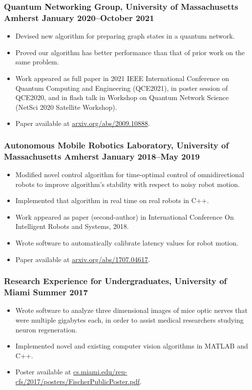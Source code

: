 \documentclass{article}
\begin{document}
		\subsubsection*{Quantum Networking Group, University of Massachusetts Amherst \hfill \normalfont \normalsize January 2020--October 2021}
			\begin{itemize}[leftmargin=40pt]
				\item Devised new algorithm for preparing graph states in a quantum network.
				\item Proved our algorithm has better performance than that of prior work on the same problem.
				\item Work appeared as full paper in 2021 IEEE International Conference on Quantum Computing and Engineering (QCE2021), in poster session of QCE2020, and in flash talk in Workshop on Quantum Network Science (NetSci 2020 Satellite Workshop).
				\item Paper available at \href{https://arxiv.org/abs/2009.10888}{arxiv.org/abs/2009.10888}.
			\end{itemize}
		\subsubsection*{Autonomous Mobile Robotics Laboratory, University of Massachusetts Amherst \hfill \normalfont \normalsize January 2018--May 2019}
			\begin{itemize}[leftmargin=40pt]
				\item Modified novel control algorithm for time-optimal control of omnidirectional robots to improve algorithm's stability with respect to noisy robot motion.
				\item Implemented that algorithm in real time on real robots in C++.
				\item Work appeared as paper (second-author) in International Conference On Intelligent Robots and Systems, 2018.
				\item Wrote software to automatically calibrate latency values for robot motion.
				\item Paper available at \href{https://arxiv.org/abs/1707.04617}{arxiv.org/abs/1707.04617}.
			\end{itemize}
		\subsubsection*{Research Experience for Undergraduates, University of Miami \hfill \normalfont \normalsize Summer 2017}
			\begin{itemize}[leftmargin=40pt]
				\item Wrote software to analyze three dimensional images of mice optic nerves that were multiple gigabytes each, in order to assist medical researchers studying neuron regeneration.
				\item Implemented novel and existing computer vision algorithms in MATLAB and C++.
				\item Poster available at \href{http://cs.miami.edu/reu-cfs/2017/posters/FischerPublicPoster.pdf}{cs.miami.edu/reu-cfs/2017/posters/FischerPublicPoster.pdf}.
			\end{itemize}
	
\end{document}

